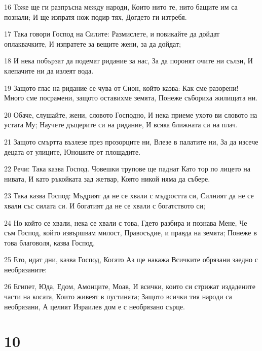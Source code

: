 \par 16 Тоже ще ги разпръсна между народи, Които нито те, нито бащите им са познали; И ще изпратя нож подир тях, Догдето ги изтребя.
\par 17 Така говори Господ на Силите: Размислете, и повикайте да дойдат оплаквачките, И изпратете за вещите жени, за да дойдат;
\par 18 И нека побързат да подемат ридание за нас, За да поронят очите ни сълзи, И клепачите ни да излеят вода.
\par 19 Защото глас на ридание се чува от Сион, който казва: Как сме разорени! Много сме посрамени, защото оставихме земята, Понеже събориха жилищата ни.
\par 20 Обаче, слушайте, жени, словото Господно, И нека приеме ухото ви словото на устата Му; Научете дъщерите си на ридание, И всяка ближната си на плач.
\par 21 Защото смъртта възлезе през прозорците ни, Влезе в палатите ни, За да изсече децата от улиците, Юношите от площадите.
\par 22 Речи: Така казва Господ. Човешки трупове ще паднат Като тор по лицето на нивата, И като ръкойката зад жетвар, Която никой няма да събере.
\par 23 Така казва Господ: Мъдрият да не се хвали с мъдростта си, Силният да не се хвали със силата си. И богатият да не се хвали с богатството си;
\par 24 Но който се хвали, нека се хвали с това, Гдето разбира и познава Мене, Че съм Господ, който извършвам милост, Правосъдие, и правда на земята; Понеже в това благоволя, казва Господ,
\par 25 Ето, идат дни, казва Господ, Когато Аз ще накажа Всичките обрязани заедно с необрязаните:
\par 26 Египет, Юда, Едом, Амонците, Моав, И всички, които си стрижат издадените части на косата, Които живеят в пустинята; Защото всички тия народи са необрязани, А целият Израилев дом е с необрязано сърце.

\chapter{10}


